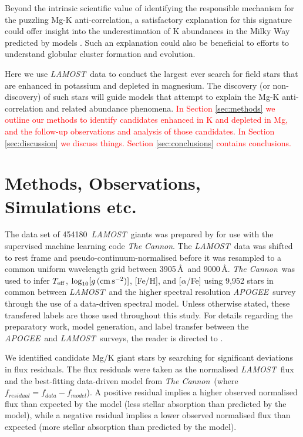 \documentclass[a4paper,fleqn,usenatbib]{mnras}
\newcommand{\todo}[1]{\textcolor{red}{#1}}
\newcommand{\LamostGiants}{454180}
\newcommand{\project}[1]{\emph{#1}}
\newcommand{\lamost}{\project{LAMOST}}
\newcommand{\apogee}{\project{APOGEE}}
\newcommand{\tc}{\project{The Cannon}}
\newcommand{\teff}{T_{\rm eff}}
\newcommand{\logg}{\log_{10}[g\,({\rm cm\,s}^{-2})]}
\begin{document}
Beyond the intrinsic scientific value of identifying the responsible mechanism for the puzzling Mg-K anti-correlation, a satisfactory explanation for this signature could offer insight into the underestimation of K abundances in the Milky Way predicted by models \citep{kobayashi2011}. Such an explanation could also be beneficial to efforts to understand globular cluster formation and evolution.

Here we use \lamost\ data to conduct the largest ever search for field stars that are enhanced in potassium and depleted in magnesium. The discovery (or non-discovery) of such stars will guide models that attempt to explain the Mg-K anti-correlation and related abundance phenomena. \todo{In Section \ref{sec:methods} we outline our methods to identify candidates enhanced in K and depleted in Mg, and the follow-up observations and analysis of those candidates. In Section \ref{sec:discussion} we discuss things. Section \ref{sec:conclusions} contains conclusions.}




\section{Methods, Observations, Simulations etc.}

The data set of \LamostGiants\ \lamost\ giants was prepared by \citet{ho2017} for use with the supervised machine learning code \tc. The \lamost\ data was shifted to rest frame and pseudo-continuum-normalised before it was resampled to a common uniform wavelength grid between 3905\,\AA\ and 9000\,\AA. \tc\ was used to infer $\teff$, $\logg$, [Fe/H], and [$\alpha$/Fe] using 9,952 stars in common between \lamost\ and the higher spectral resolution \apogee\ survey through the use of a data-driven spectral model. Unless otherwise stated, these transfered labels are those used throughout this study. For details regarding the preparatory work, model generation, and label transfer between the \apogee\ and \lamost\ surveys, the reader is directed to \citet{ho2017}. 

We identified candidate Mg/K giant stars by searching for significant deviations in flux residuals. The flux residuals were taken as the normalised \lamost\ flux and the best-fitting data-driven model from \tc\ (where $f_{residual} = f_{data} - f_{model}$). A positive residual implies a higher observed normalised flux than expected by the model (less stellar absorption than predicted by the model), while a negative residual implies a lower observed normalised flux than expected (more stellar absorption than predicted by the model). 
\end{document}
